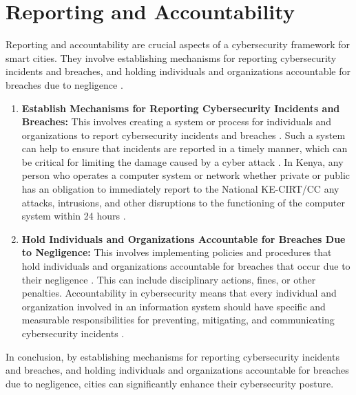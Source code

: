 \documentclass{article}
\begin{document}
\section{Reporting and Accountability}
Reporting and accountability are crucial aspects of a cybersecurity framework for smart cities. They involve establishing mechanisms for reporting cybersecurity incidents and breaches, and holding individuals and organizations accountable for breaches due to negligence \cite{singh-2023}\cite{kost-2023}\cite{chin-2023}.
\begin{enumerate}[label=\alph*)]
\item \textbf{Establish Mechanisms for Reporting Cybersecurity Incidents and Breaches: }This involves creating a system or process for individuals and organizations to report cybersecurity incidents and breaches \cite{singh-2023}\cite{kost-2023}\cite{chin-2023}. Such a system can help to ensure that incidents are reported in a timely manner, which can be critical for limiting the damage caused by a cyber attack \cite{singh-2023}\cite{kost-2023}\cite{chin-2023}. In Kenya, any person who operates a computer system or network whether private or public has an obligation to immediately report to the National KE-CIRT/CC any attacks, intrusions, and other disruptions to the functioning of the computer system within 24 hours \cite{ashitiva-2022}.
\item \textbf{Hold Individuals and Organizations Accountable for Breaches Due to Negligence:}  This involves implementing policies and procedures that hold individuals and organizations accountable for breaches that occur due to their negligence \cite{singh-2023}\cite{kost-2023}\cite{chin-2023}. This can include disciplinary actions, fines, or other penalties\cite{singh-2023}\cite{kost-2023}\cite{chin-2023}. Accountability in cybersecurity means that every individual and organization involved in an information system should have specific and measurable responsibilities for preventing, mitigating, and communicating cybersecurity incidents \cite{singh-2023}.


\end{enumerate}
In conclusion, by establishing mechanisms for reporting cybersecurity incidents and breaches, and holding individuals and organizations accountable for breaches due to negligence, cities can significantly enhance their cybersecurity posture\cite{singh-2023}\cite{kost-2023}\cite{chin-2023}.
\end{document}
